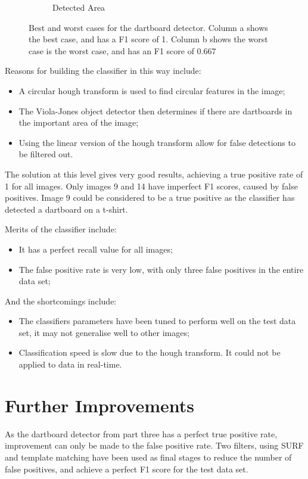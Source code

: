 \documentclass[conference]{IEEEtran}
\begin{document}
\begin{figure}[htb]
\begin{subfigure}{.5\linewidth}
  \caption{Detected Area}
  \label{fig:sub2}
\end{subfigure}
\caption{Best and worst cases for the dartboard detector. Column a shows the best case, and has a F1 score of 1.  Column b shows the worst case is the worst case, and has an F1 score of 0.667}
\end{figure}
Reasons  for building the classifier in this way include: 
\begin{itemize}
\item A circular hough transform is used to find circular features in the image;
\item The Viola-Jones object detector then determines if there are dartboards in the important area of the image;
\item Using the linear version of the hough transform allow for false detections to be filtered out.
\end{itemize}
\newpage
\par
The solution at this level gives very good results, achieving a true positive rate of 1 for all images. Only images 9 and 14 have imperfect F1 scores, caused by false positives. Image 9 could be considered to be a true positive as the classifier has detected a dartboard on a t-shirt. 
\par
Merits of the classifier include: 
\begin{itemize}
	\item It has a perfect recall value for all images;
	\item The false positive rate is very low, with only three false positives in the entire data set;
\end{itemize}
And the shortcomings include:
\begin{itemize}
	\item The classifiers parameters have been tuned to perform well on the test data set, it may not generalise well to other images;
	\item Classification speed is slow due to the hough transform. It could not be applied to data in real-time. 
\end{itemize}




\newpage
\section{Further Improvements}
As the dartboard detector from part three has a perfect true positive rate, improvement can only be made to the false positive rate. Two filters, using SURF and template matching have been used as final stages to reduce the number of false positives, and achieve a perfect F1 score for the test data set. 
\par
\end{document}

